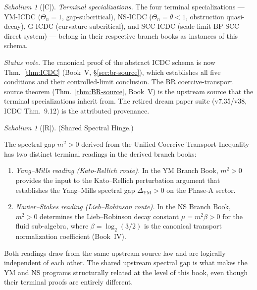 \documentclass[12pt,oneside]{amsbook}
\theoremstyle{plain}
\theoremstyle{definition}
\theoremstyle{remark}
\newtheorem{scholium}[theorem]{Scholium}
\newcommand{\status}[1]{\textup{[#1]}}
\begin{document}
\begin{scholium}[\status{C}]
\emph{Terminal specializations.}  The four terminal specializations
--- YM-ICDC ($\Theta_n = 1$, gap-subcritical), NS-ICDC
($\Theta_n = \theta < 1$, obstruction quasi-decay), G-ICDC
(curvature-subcritical), and SCC-ICDC (scale-limit BP-SCC direct
system) --- belong in their respective branch books as instances of
this schema.

\emph{Status note.}  The canonical proof of the abstract ICDC schema
is now Thm.~\ref{thm:ICDC} (Book~V, \S\ref{sec:br-source}), which
establishes all five conditions and their controlled-limit conclusion.
The BR coercive-transport source theorem (Thm.~\ref{thm:BR-source},
Book~V) is the upstream source that the terminal specializations
inherit from.  The retired dream paper suite (v7.35/v38, ICDC
Thm.~9.12) is the attributed provenance.
\end{scholium}


\begin{scholium}[\status{R}]\label{sch:spectral-hinge}
\textup{(Shared Spectral Hinge.)}

The spectral gap $m^2 > 0$ derived from the Unified
Coercive-Transport Inequality has two distinct terminal readings in
the derived branch books:
\begin{enumerate}[label=\textup{(\roman*)}]
  \item \emph{Yang--Mills reading (Kato-Rellich route).}  In the YM
        Branch Book, $m^2 > 0$ provides the input to the Kato--Rellich
        perturbation argument that establishes the Yang--Mills spectral
        gap $\Delta_{\mathrm{YM}} > 0$ on the Phase-A sector.
  \item \emph{Navier--Stokes reading (Lieb--Robinson route).}  In the
        NS Branch Book, $m^2 > 0$ determines the Lieb--Robinson decay
        constant $\mu = m^2 \beta > 0$ for the fluid sub-algebra,
        where $\beta = \log_2(3/2)$ is the canonical transport
        normalization coefficient (Book~IV).
\end{enumerate}
Both readings draw from the same upstream source law and are
logically independent of each other.  The shared upstream spectral gap
is what makes the YM and NS programs structurally related at the level
of this book, even though their terminal proofs are entirely different.
\end{scholium}

\end{document}
